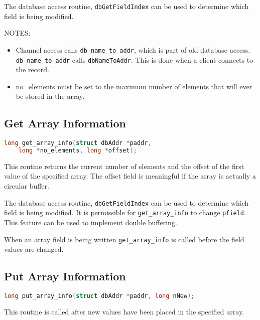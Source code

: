 The database access routine, \verb|dbGetFieldIndex| can be used to determine which field is being modified.

NOTES:

\begin{itemize}
\item Channel access calls \verb|db_name_to_addr|, which is part of old database access.
\verb|db_name_to_addr| calls \verb|dbNameToAddr|.
This is done when a client connects to the record.

\item no\_elements must be set to the maximum number of elements that will ever be stored in the array.

\end{itemize}

\subsection{Get Array Information}

\begin{lstlisting}[language=C]
long get_array_info(struct dbAddr *paddr,
    long *no_elements, long *offset);
\end{lstlisting}

This routine returns the current number of elements and the offset of the first value of the specified array.
The offset field is meaningful if the array is actually a circular buffer.

The database access routine, \verb|dbGetFieldIndex| can be used to determine which field is being modified.
It is permissible for \verb|get_array_info| to change \verb|pfield|.
This feature can be used to implement double buffering.

When an array field is being written \verb|get_array_info| is called before the field values are changed.

\subsection{Put Array Information}

\begin{lstlisting}[language=C]
long put_array_info(struct dbAddr *paddr, long nNew);
\end{lstlisting}

This routine is called after new values have been placed in the specified array.

